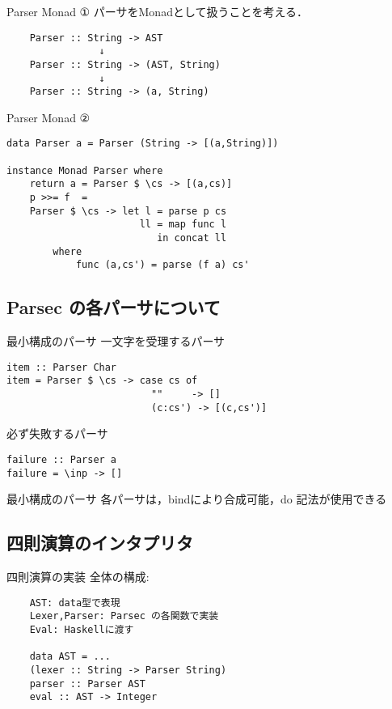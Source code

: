\documentclass[uplatex,dvipdfmx,ja=standard]{beamer}
\begin{document}
\begin{frame}[fragile]{Parser Monad ①}
    パーサをMonadとして扱うことを考える．
    \begin{verbatim}
    Parser :: String -> AST
                ↓
    Parser :: String -> (AST, String)
                ↓
    Parser :: String -> (a, String)
    \end{verbatim}
\end{frame}

\begin{frame}[fragile]{Parser Monad ②}
    \begin{verbatim}
data Parser a = Parser (String -> [(a,String)])

instance Monad Parser where
    return a = Parser $ \cs -> [(a,cs)]
    p >>= f  = 
    Parser $ \cs -> let l = parse p cs
                       ll = map func l
                          in concat ll
        where
            func (a,cs') = parse (f a) cs'
    \end{verbatim}
\end{frame}

\subsection{Parsec の各パーサについて}

\begin{frame}[fragile]{最小構成のパーサ}
一文字を受理するパーサ
    \begin{verbatim}
item :: Parser Char
item = Parser $ \cs -> case cs of
                         ""     -> []
                         (c:cs') -> [(c,cs')]
    \end{verbatim}
必ず失敗するパーサ
    \begin{verbatim}
failure :: Parser a
failure = \inp -> []
    \end{verbatim}
\end{frame}


\begin{frame}{最小構成のパーサ}
    各パーサは，bindにより合成可能，do 記法が使用できる

\end{frame}

\subsection{四則演算のインタプリタ}

\begin{frame}[fragile]{四則演算の実装}
    全体の構成:
    \begin{verbatim}
    AST: data型で表現
    Lexer,Parser: Parsec の各関数で実装
    Eval: Haskellに渡す

    data AST = ...
    (lexer :: String -> Parser String)
    parser :: Parser AST
    eval :: AST -> Integer
    \end{verbatim}
\end{frame}
\end{document}

